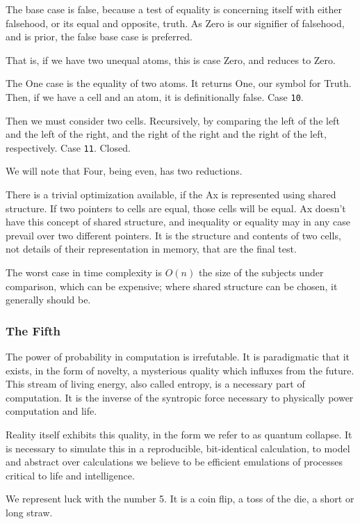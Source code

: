 \documentclass[twoside]{article}
\begin{document}
The base case is false, because a test of equality is concerning itself with either falsehood, or its equal and opposite, truth. As Zero is our signifier of falsehood, and is prior, the false base case is preferred.

That is, if we have two unequal atoms, this is case Zero, and reduces to Zero.

The One case is the equality of two atoms. It returns One, our symbol for Truth. Then, if we have a cell and an atom, it is definitionally false. Case \texttt{10}.

Then we must consider two cells. Recursively, by comparing the left of the left and the left of the right, and the right of the right and the right of the left, respectively. Case \texttt{11}. Closed.

We will note that Four, being even, has two reductions.

There is a trivial optimization available, if the Ax is represented using shared structure. If two pointers to cells are equal, those cells will be equal. Ax doesn't have this concept of shared structure, and inequality or equality may in any case prevail over two different pointers. It is the structure and contents of two cells, not details of their representation in memory, that are the final test.

The worst case in time complexity is $O(n)$ the size of the subjects under comparison, which can be expensive; where shared structure can be chosen, it generally should be.

\subsubsection{The Fifth}

The power of probability in computation is irrefutable. It is paradigmatic that it exists, in the form of novelty, a mysterious quality which influxes from the future. This stream of living energy, also called entropy, is a necessary part of computation. It is the inverse of the syntropic force necessary to physically power computation and life.

Reality itself exhibits this quality, in the form we refer to as quantum collapse. It is necessary to simulate this in a reproducible, bit-identical calculation, to model and abstract over calculations we believe to be efficient emulations of processes critical to life and intelligence.

We represent luck with the number 5. It is a coin flip, a toss of the die, a short or long straw.
\end{document}
